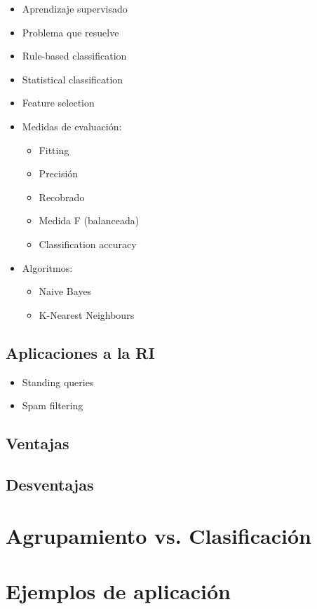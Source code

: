 \documentclass{llncs}
\begin{document}
\begin{itemize}
	\item Aprendizaje supervisado
	
	\item Problema que resuelve
\end{itemize}

\begin{itemize}
\item Rule-based classification

\item Statistical classification

\item Feature selection

\item Medidas de evaluaci\'on:
\begin{itemize}
	\item Fitting
	\item Precisi\'on
	\item Recobrado
	\item Medida F (balanceada)
	\item Classification accuracy
\end{itemize}

\item Algoritmos:
\begin{itemize}
	\item Naive Bayes
	
	
	\item K-Nearest Neighbours
\end{itemize}
\end{itemize}

\subsection{Aplicaciones a la RI}
\begin{itemize}
	\item Standing queries
	\item Spam filtering
\end{itemize}

\subsection{Ventajas} 

\subsection{Desventajas}

\section{Agrupamiento vs. Clasificaci\'on}

\section{Ejemplos de aplicación}
\end{document}
